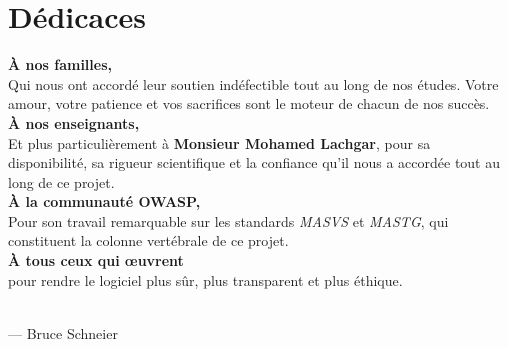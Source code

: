 \chapter*{Dédicaces}
\thispagestyle{empty}


\vspace*{3.5cm}

\begin{flushright}
  \begin{minipage}{0.75\textwidth}
    \itshape\large\color{DarkNavy!80}

    \textbf{\color{PrimaryBlue}À nos familles,}\\[0.5em]
    Qui nous ont accordé leur soutien indéfectible tout au long de nos études.
    Votre amour, votre patience et vos sacrifices sont le moteur de chacun de nos succès.\\[1.5em]

    \textbf{\color{PrimaryBlue}À nos enseignants,}\\[0.5em]
    Et plus particulièrement à \textbf{Monsieur Mohamed Lachgar},
    pour sa disponibilité, sa rigueur scientifique et la confiance qu'il nous a accordée
    tout au long de ce projet.\\[1.5em]

    \textbf{\color{PrimaryBlue}À la communauté OWASP,}\\[0.5em]
    Pour son travail remarquable sur les standards \textit{MASVS} et \textit{MASTG},
    qui constituent la colonne vertébrale de ce projet.\\[1.5em]

    \textbf{\color{PrimaryBlue}À tous ceux qui œuvrent}\\[0.5em]
    pour rendre le logiciel plus sûr, plus transparent et plus éthique.

  \end{minipage}
\end{flushright}

\vfill
\begin{center}
  \\[4pt]
  {\small\color{SlateGray} --- Bruce Schneier}
\end{center}
\vspace{1cm}
\cleardoublepage
